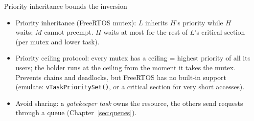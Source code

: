 \begin{frame}{Priority inheritance bounds the inversion}
  \begin{center}
  \end{center}
  \begin{itemize}
    \small
    \item Priority inheritance (FreeRTOS mutex): $L$ inherits $H$'s priority while $H$ waits; $M$ cannot preempt. $H$ waits at most for the rest of $L$'s critical section (per mutex and lower task).
    \item Priority ceiling protocol: every mutex has a ceiling = highest priority of all its users; the holder runs at the ceiling from the moment it takes the mutex. Prevents chains and deadlocks, but FreeRTOS has no built-in support (emulate: \texttt{vTaskPrioritySet()}, or a critical section for very short accesses).
    \item Avoid sharing: a \emph{gatekeeper task} owns the resource, the others send requests through a queue (Chapter~\ref{sec:queues}).
  \end{itemize}
\end{frame}


